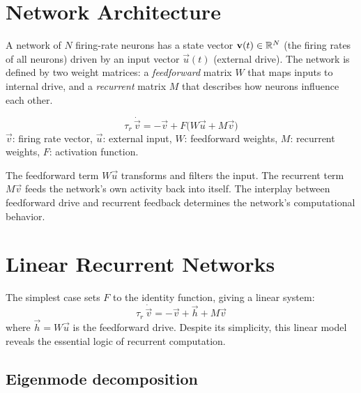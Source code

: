 \section{Network Architecture}
\label{sec:network-architecture}

A network of $N$ firing-rate neurons has a state vector $\mathbf{v}(t) \in \mathbb{R}^N$ (the firing rates of all neurons) driven by an input vector $\vec{u}(t)$ (external drive). The network is defined by two weight matrices: a \emph{feedforward} matrix $W$ that maps inputs to internal drive, and a \emph{recurrent} matrix $M$ that describes how neurons influence each other.

\begin{keyequation}
\begin{equation}
  \tau_r\,\dot{\vec{v}} = -\vec{v} + F\bigl(W\vec{u} + M\vec{v}\bigr)
  \label{eq:rate-network}
\end{equation}
\tcblower
$\vec{v}$: firing rate vector, \quad
$\vec{u}$: external input, \quad
$W$: feedforward weights, \quad
$M$: recurrent weights, \quad
$F$: activation function.
\end{keyequation}

\noindent The feedforward term $W\vec{u}$ transforms and filters the input. The recurrent term $M\vec{v}$ feeds the network's own activity back into itself. The interplay between feedforward drive and recurrent feedback determines the network's computational behavior.

\section{Linear Recurrent Networks}
\label{sec:linear-networks}

The simplest case sets $F$ to the identity function, giving a linear system:
%
\begin{equation}
  \tau_r\,\dot{\vec{v}} = -\vec{v} + \vec{h} + M\vec{v}
  \label{eq:linear-network}
\end{equation}
%
where $\vec{h} = W\vec{u}$ is the feedforward drive. Despite its simplicity, this linear model reveals the essential logic of recurrent computation.

\subsection{Eigenmode decomposition}

